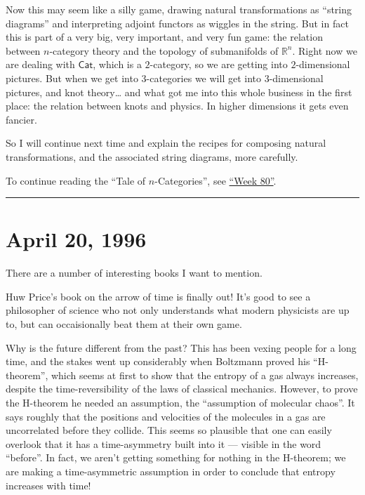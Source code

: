 \documentclass{article}
\begin{document}
Now this may seem like a silly game, drawing natural transformations as
``string diagrams'' and interpreting adjoint functors as wiggles in the
string. But in fact this is part of a very big, very important, and very
fun game: the relation between \(n\)-category theory and the topology of
submanifolds of \(\mathbb{R}^n\). Right now we are dealing with
\(\mathsf{Cat}\), which is a \(2\)-category, so we are getting into
\(2\)-dimensional pictures. But when we get into \(3\)-categories we
will get into \(3\)-dimensional pictures, and knot theory\ldots{} and
what got me into this whole business in the first place: the relation
between knots and physics. In higher dimensions it gets even fancier.

So I will continue next time and explain the recipes for composing
natural transformations, and the associated string diagrams, more
carefully.

To continue reading the ``Tale of \(n\)-Categories'', see
\protect\hyperlink{week80}{``Week 80''}.

\begin{center}\rule{0.5\linewidth}{0.5pt}\end{center}



\hypertarget{week80}{%
\section{April 20, 1996}\label{week80}}

There are a number of interesting books I want to mention.

Huw Price's book on the arrow of time is finally out! It's good to see a
philosopher of science who not only understands what modern physicists
are up to, but can occaisionally beat them at their own game.

Why is the future different from the past? This has been vexing people
for a long time, and the stakes went up considerably when Boltzmann
proved his ``H-theorem'', which seems at first to show that the entropy
of a gas always increases, despite the time-reversibility of the laws of
classical mechanics. However, to prove the H-theorem he needed an
assumption, the ``assumption of molecular chaos''. It says roughly that
the positions and velocities of the molecules in a gas are uncorrelated
before they collide. This seems so plausible that one can easily
overlook that it has a time-asymmetry built into it --- visible in the
word ``before''. In fact, we aren't getting something for nothing in the
H-theorem; we are making a time-asymmetric assumption in order to
conclude that entropy increases with time!
\end{document}
